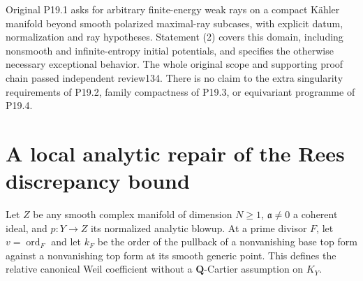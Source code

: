 \documentclass[11pt]{article}
\newcommand{\ord}{\operatorname{ord}}
\begin{document}
Original P19.1 asks for arbitrary finite-energy weak rays on a compact
K\"ahler manifold beyond smooth polarized maximal-ray subcases,
with explicit datum, normalization and ray hypotheses. Statement (2)
covers this domain, including nonsmooth and infinite-entropy initial
potentials, and specifies the otherwise necessary exceptional
behavior. The whole original scope and supporting proof chain
passed independent review134. There is no claim to the extra singularity
requirements of P19.2, family compactness of P19.3, or equivariant
programme of P19.4.

\appendix
\section{A local analytic repair of the Rees discrepancy bound}
Let $Z$ be any smooth complex manifold of dimension $N\geq1$,
$\mathfrak a\ne0$ a coherent ideal, and $p:Y\to Z$ its normalized
analytic blowup. At a prime divisor $F$, let $v=\ord_F$ and let
$k_F$ be the order of the pullback of a nonvanishing base top form
against a nonvanishing top form at its smooth generic point.
This defines the relative canonical Weil coefficient without a
$\mathbf Q$-Cartier assumption on $K_Y$.
\end{document}
